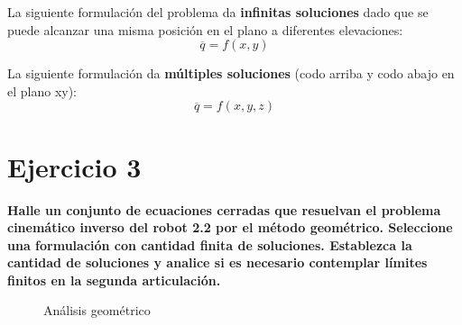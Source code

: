 \documentclass[a4paper,12pt]{article}
\begin{document}
La siguiente formulación del problema da \textbf{infinitas soluciones} dado que se puede alcanzar una misma posición en el plano a diferentes elevaciones:
\begin{equation*}
    \overline{q} = f(x, y)
\end{equation*}

La siguiente formulación da \textbf{múltiples soluciones} (codo arriba y codo abajo en el plano xy):
\begin{equation*}
    \overline{q} = f(x, y, z)
\end{equation*}

\section{Ejercicio 3}
\textbf{Halle un conjunto de ecuaciones cerradas que resuelvan el problema
cinemático inverso del robot 2.2 por el método geométrico. Seleccione una formulación con
cantidad finita de soluciones. Establezca la cantidad de soluciones y analice si es necesario
contemplar límites finitos en la segunda articulación.}

\begin{figure}[H]
    \centering
    \begin{adjustbox}{scale = 0.7, max width=\columnwidth}
    \end{adjustbox}
    \caption{Análisis geométrico}
\end{figure}

\end{document}
